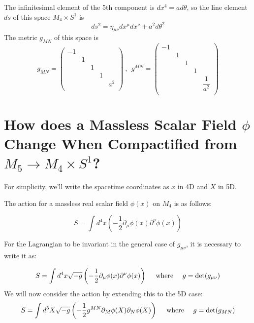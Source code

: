 \documentclass{article}
\begin{document}
The infinitesimal element of the 5th component is $dx^{4} = a d \theta$, so
the line element $ds$ of this space $M_{4} \times S^{1}$ is
$$
	ds^{2}
	=
	\eta_{\mu \nu}
	dx^{\mu} dx^{\nu}
	+
	a^{2} d \theta^{2}
$$
The metric $g_{MN}$ of this space is
$$
	g_{MN}
	=
	\begin{pmatrix}
		-1 &   &   &   &       \\
		   & 1 &   &   &       \\
		   &   & 1 &   &       \\
		   &   &   & 1 &       \\
		   &   &   &   & a^{2} \\
	\end{pmatrix}
	\ , \ \
	g^{MN}
	=
	\begin{pmatrix}
		-1 &   &   &   &                  \\
		   & 1 &   &   &                  \\
		   &   & 1 &   &                  \\
		   &   &   & 1 &                  \\
		   &   &   &   & \dfrac{1}{a^{2}} \\
	\end{pmatrix}
$$

\section{
  How does a Massless Scalar Field $\phi$ Change When Compactified from $M_{5} \to M_{4} \times S^{1}$?
 }

For simplicity, we'll write the spacetime coordinates as $x$ in 4D and $X$ in 5D.

The action for a massless real scalar field $\phi(x)$ on $M_{4}$ is as follows:

$$
	S
	=
	\int d^{4} x
	\left(
	- \dfrac{1}{2}
	\partial_{\mu} \phi(x)
	\partial^{\nu} \phi(x)
	\right)
$$

For the Lagrangian to be invariant in the general case of $g_{\mu \nu}$, it is necessary to write it as:

$$
	S
	=
	\int d^{4} x
	\sqrt{ - g }
	\left(
	- \dfrac{1}{2}
	\partial_{\mu} \phi(x)
	\partial^{\nu} \phi(x)
	\right)
	\ \ \ \
	{ \rm where }
	\ \ \ \
	g = \det(g_{\mu \nu})
$$
We will now consider the action by extending this to the 5D case:
$$
	S
	=
	\int d^{5} X
	\sqrt{ - g }
	\left(
	- \dfrac{1}{2}
	g^{MN}
	\partial_{M} \phi(X)
	\partial_{N} \phi(X)
	\right)
	\ \ \ \
	{ \rm where }
	\ \ \ \
	g = \det(g_{MN})
$$
\end{document}
